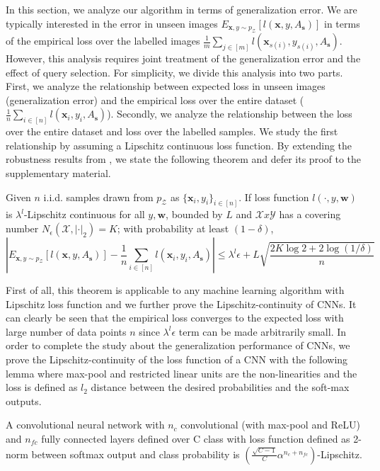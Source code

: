 In this section, we analyze our algorithm in terms of generalization error.  We are typically interested in the error in unseen images $E_{\mathbf{x},y \sim p_\mathcal{Z}}[l(\mathbf{x},y,A_{\mathbf{s}})]$ in terms of the empirical loss over the labelled images $\frac{1}{m}\sum_{j\in[m]} l(\mathbf{x}_{s(i)},y_{s(i)},A_{\mathbf{s}})$. However, this analysis requires joint treatment of the generalization error and the effect of query selection. For simplicity, we divide this analysis into two parts. First, we analyze the relationship between expected loss in unseen images (generalization error) and the empirical loss over the entire dataset ($\frac{1}{n}\sum_{i\in [n]} l(\mathbf{x}_i,y_i,A_\mathbf{s})$). Secondly, we analyze the relationship between the loss over the entire dataset and loss over the labelled samples. We study the first relationship by assuming a Lipschitz continuous loss function. By extending the robustness results from \cite{robust}, we state the following theorem and defer its proof to the supplementary material.

\begin{theorem}
Given $n$ i.i.d. samples drawn from $p_\mathcal{Z}$ as $\{\mathbf{x}_i,y_i\}_{i\in[n]}$. If loss function $l(\cdot,y,\mathbf{w})$ is $\lambda^l$-Lipschitz continuous for all $y, \mathbf{w}$, bounded by $L$ and $\mathcal{X}x\mathcal{Y}$ has a covering number $N_{\epsilon}(\mathcal{X},|\cdot|_2)=K$; with probability at least $(1-\delta)$,
\[
\left|E_{\mathbf{x},y \sim p_\mathcal{Z}}[l(\mathbf{x},y, A_\mathbf{s})] - \frac{1}{n}\sum_{i\in[n]} l(\mathbf{x}_i,y_i,A_\mathbf{s})\right|  \leq  \lambda^l \epsilon + L \sqrt{\frac{2K\log 2 + 2\log (1/\delta)}{n}}
\]
\label{mainthm}
\end{theorem}

First of all, this theorem is applicable to any machine learning algorithm with Lipschitz loss function and we further prove the Lipschitz-continuity of CNNs. It can clearly be seen that the empirical loss converges to the expected loss with large number of data points $n$ since $\lambda^l\epsilon$ term can be made arbitrarily small. In order to complete the study about the generalization performance of CNNs, we prove the Lipschitz-continuity of the loss function of a CNN with the following lemma where max-pool and restricted linear units are the non-linearities and the loss is defined as $l_2$ distance between the desired probabilities and the soft-max outputs.

\begin{lemma}
A convolutional neural network with $n_c$ convolutional (with max-pool and ReLU) and $n_{fc}$ fully connected layers defined over C class with loss function defined as 2-norm between softmax output and class probability is $\left(\frac{\sqrt{C-1}}{C} \alpha^{n_c+n_{fc}}\right)$-Lipschitz.
\end{lemma}

